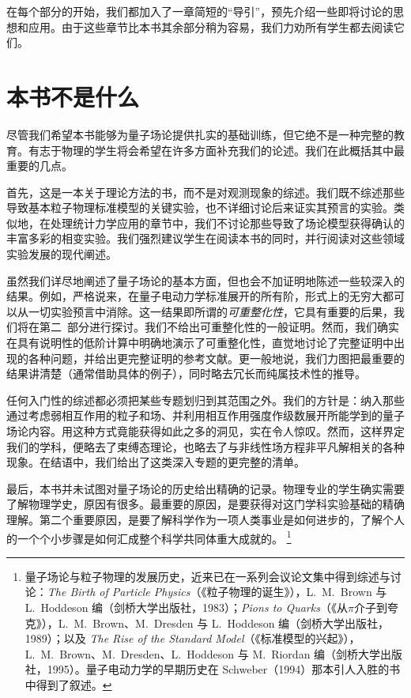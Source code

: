 在每个部分的开始，我们都加入了一章简短的``导引''，预先介绍一些即将讨论的思想和应用。由于这些章节比本书其余部分稍为容易，我们力劝所有学生都去阅读它们。

\section*{本书不是什么}

尽管我们希望本书能够为量子场论提供扎实的基础训练，但它绝不是一种完整的教育。有志于物理的学生将会希望在许多方面补充我们的论述。我们在此概括其中最重要的几点。

首先，这是一本关于理论方法的书，而不是对观测现象的综述。我们既不综述那些导致基本粒子物理标准模型的关键实验，也不详细讨论后来证实其预言的实验。类似地，在处理统计力学应用的章节中，我们不讨论那些导致了场论模型获得确认的丰富多彩的相变实验。我们强烈建议学生在阅读本书的同时，并行阅读对这些领域实验发展的现代阐述。

虽然我们详尽地阐述了量子场论的基本方面，但也会不加证明地陈述一些较深入的结果。例如，严格说来，在量子电动力学标准展开的所有阶，形式上的无穷大都可以从一切实验预言中消除。这一结果即所谓的\emph{可重整化性}，它具有重要的后果，我们将在第二~部分进行探讨。我们不给出可重整化性的一般证明。然而，我们确实在具有说明性的低阶计算中明确地演示了可重整化性，直觉地讨论了完整证明中出现的各种问题，并给出更完整证明的参考文献。更一般地说，我们力图把最重要的结果讲清楚（通常借助具体的例子），同时略去冗长而纯属技术性的推导。

任何入门性的综述都必须把某些专题划归到其范围之外。我们的方针是：纳入那些通过考虑弱相互作用的粒子和场、并利用相互作用强度作级数展开所能学到的量子场论内容。用这种方式竟能获得如此之多的洞见，实在令人惊叹。然而，这样界定我们的学科，便略去了束缚态理论，也略去了与非线性场方程非平凡解相关的各种现象。在结语中，我们给出了这类深入专题的更完整的清单。

最后，本书并未试图对量子场论的历史给出精确的记录。物理专业的学生确实需要了解物理学史，原因有很多。最重要的原因，是要获得对这门学科实验基础的精确理解。第二个重要原因，是要了解科学作为一项人类事业是如何进步的，了解个人的一个个小步骤是如何汇成整个科学共同体重大成就的。%
\footnote{量子场论与粒子物理的发展历史，近来已在一系列会议论文集中得到综述与讨论：\emph{The Birth of Particle Physics}（《粒子物理的诞生》），L.~M.~Brown 与 L.~Hoddeson 编（剑桥大学出版社，1983）；\emph{Pions to Quarks}（《从$\pi$介子到夸克》），L.~M.~Brown、M.~Dresden 与 L.~Hoddeson 编（剑桥大学出版社，1989）；以及 \emph{The Rise of the Standard Model}（《标准模型的兴起》），L.~M.~Brown、M.~Dresden、L.~Hoddeson 与 M.~Riordan 编（剑桥大学出版社，1995）。量子电动力学的早期历史在 Schweber（1994）那本引人入胜的书中得到了叙述。}

